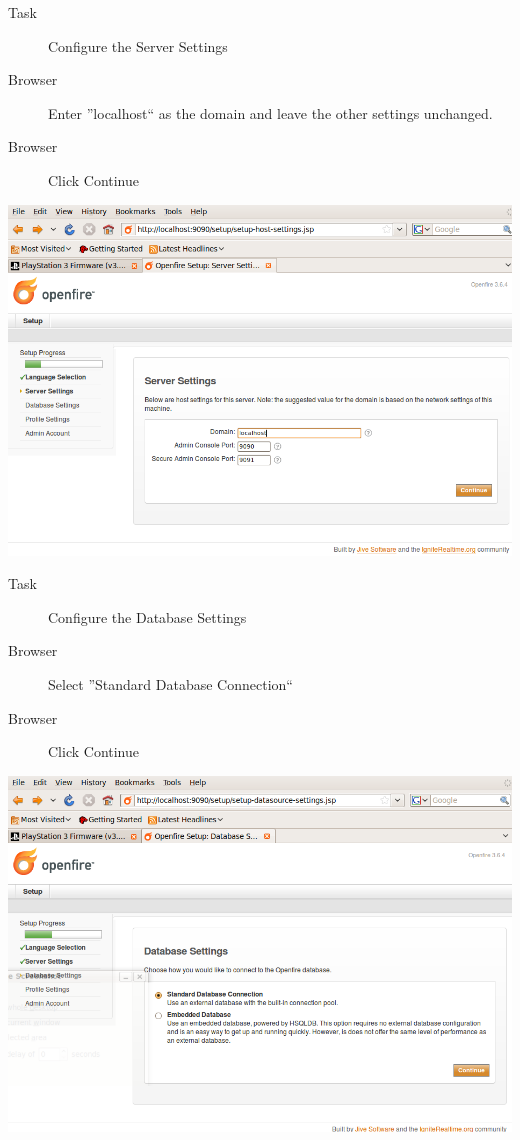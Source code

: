 \begin{description}
\item [Task] Configure the Server Settings
\item [Browser] Enter ''localhost`` as the domain and leave the other settings unchanged.
\item [Browser] Click Continue
\end{description}
\begin{center}
\includegraphics[scale=0.5]{figs/deploy/openfire-2.png} 
\end{center}


\begin{description}
\item [Task] Configure the Database Settings
\item [Browser] Select ''Standard Database Connection``
\item [Browser] Click Continue
\end{description}
\begin{center}
\includegraphics[scale=0.5]{figs/deploy/openfire-3.png} 
\end{center}

